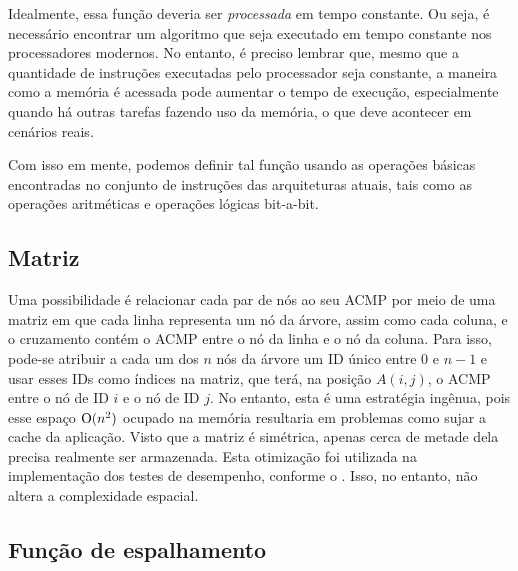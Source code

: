 Idealmente, essa função \ACMPIDs deveria ser \textit{processada} em tempo constante.
Ou seja, é necessário encontrar um algoritmo que seja executado em tempo constante nos processadores modernos.
No entanto, é preciso lembrar que, mesmo que a quantidade de instruções executadas pelo processador seja constante,
a maneira como a memória é acessada pode aumentar o tempo de execução, especialmente quando há outras tarefas fazendo uso da memória, o que deve acontecer em cenários reais.

Com isso em mente, podemos definir tal função usando as operações básicas encontradas no conjunto de instruções das arquiteturas atuais,
tais como as operações aritméticas e operações lógicas bit-a-bit.

\subsection{Matriz}

Uma possibilidade é relacionar cada par de nós ao seu ACMP por meio de uma matriz
em que cada linha representa um nó da árvore, assim como cada coluna, e o cruzamento contém o ACMP entre o nó da linha e o nó da coluna.
Para isso, pode-se atribuir a cada um dos $n$ nós da árvore um ID único entre $0$ e $n-1$ e usar esses IDs como índices na matriz,
que terá, na posição $A(i,j)$, o ACMP entre o nó de ID $i$ e o nó de ID $j$.
No entanto, esta é uma estratégia ingênua, pois esse espaço $\operatorname{O}(n^2)$ ocupado na memória resultaria em problemas como sujar a cache da aplicação.
Visto que a matriz é simétrica, apenas cerca de metade dela precisa realmente ser armazenada.
Esta otimização foi utilizada na implementação dos testes de desempenho, conforme o \tratar{[algoritmo X]}.
Isso, no entanto, não altera a complexidade espacial.



\subsection{Função de espalhamento}

